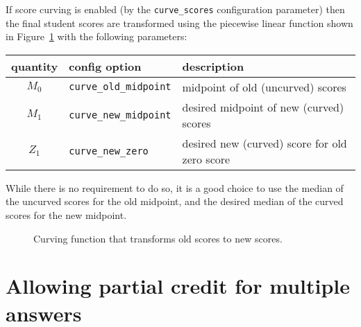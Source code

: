 \documentclass{article}
\begin{document}
If score curving is enabled (by the \texttt{curve_scores}
configuration parameter) then the final student scores are transformed
using the piecewise linear function shown in Figure~\ref{fig:curve}
with the following parameters:
\begin{center}
  \begin{tabular}{cll}
    quantity & config option & description \\
    \hline
    $M_0$ & \texttt{curve_old_midpoint} & midpoint of old (uncurved) scores \\
    $M_1$ & \texttt{curve_new_midpoint} & desired midpoint of new (curved) scores \\
    $Z_1$ & \texttt{curve_new_zero} & desired new (curved) score for old zero score
  \end{tabular}
\end{center}
While there is no requirement to do so, it is a good choice to use the
median of the uncurved scores for the old midpoint, and the desired
median of the curved scores for the new midpoint.

\begin{figure}
  \centering
  \caption{Curving function that transforms old scores to new scores.}
  \label{fig:curve}
\end{figure}

\section{Allowing partial credit for multiple answers}
\end{document}
